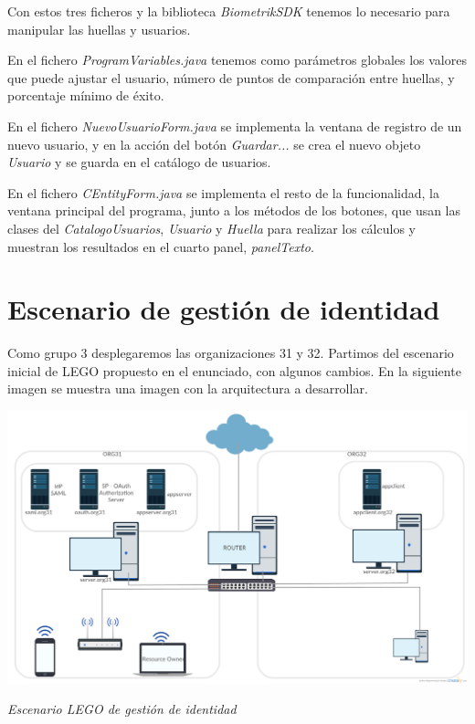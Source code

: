 \documentclass[]{article}
\begin{document}
\hfill

Con estos tres ficheros y la biblioteca \textit{BiometrikSDK} tenemos lo necesario para manipular las huellas y usuarios.

\hfill

En el fichero \textit{ProgramVariables.java} tenemos como parámetros globales los valores que puede ajustar el usuario, número de puntos de comparación entre huellas, y porcentaje mínimo de éxito.

En el fichero \textit{NuevoUsuarioForm.java} se implementa la ventana de registro de un nuevo usuario, y en la acción del botón \textit{Guardar...} se crea el nuevo objeto \textit{Usuario} y se guarda en el catálogo de usuarios.

En el fichero \textit{CEntityForm.java} se implementa el resto de la funcionalidad, la ventana principal del programa, junto a los métodos de los botones, que usan las clases del \textit{CatalogoUsuarios}, \textit{Usuario} y \textit{Huella} para realizar los cálculos y muestran los resultados en el cuarto panel, \textit{panelTexto}.



\clearpage

\section{Escenario de gestión de identidad}

Como grupo 3 desplegaremos las organizaciones 31 y 32. Partimos del escenario inicial de LEGO propuesto en el enunciado, con algunos cambios.
En la siguiente imagen se muestra una imagen con la arquitectura a desarrollar.

\begin{center}
	\includegraphics[width=1\linewidth]{images/samloauth/escenario.png}

	\textit{Escenario LEGO de gestión de identidad}
\end{center}
\end{document}
